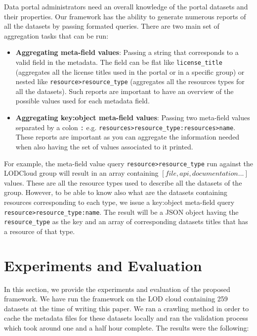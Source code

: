 \documentclass[runningheads,a4paper]{llncs}
\begin{document}
Data portal administrators need an overall knowledge of the portal datasets and their properties. Our framework has the ability to generate numerous reports of all the datasets by passing formated queries. There are two main set of aggregation tasks that can be run:
\begin{itemize}
  \item \textbf{Aggregating meta-field values}: Passing a string that corresponds to a valid field in the metadata. The field can be flat like \texttt{license\_title} (aggregates all the license titles used in the portal or in a specific group) or nested like \texttt{resource>resource\_type} (aggregates all the resources types for all the datasets). Such reports are important to have an overview of the possible values used for each metadata field.
  \item \textbf{Aggregating key:object meta-field values}: Passing two meta-field values separated by a colon \texttt{:} e.g. \texttt{resources>resource\_type:resources>name}. These reports are important as you can aggregate the information needed when also having the set of values associated to it printed.
\end{itemize}

For example, the meta-field value query \texttt{resource>resource\_type} run against the LODCloud group will result in an array containing $[file,api,documentation ...]$ values. These are all the resource types used to describe all the datasets of the group. However, to be able to know also what are the datasets containing resources corresponding to each type, we issue a key:object meta-field query \texttt{resource>resource\_type:name}. The result will be a JSON object having the \texttt{resource\_type} as the key and an array of corresponding datasets titles that has a resource of that type.


\section{Experiments and Evaluation}
\label{sec:experiment}

In this section, we provide the experiments and evaluation of the proposed framework. We have run the framework on the LOD cloud containing 259 datasets at the time of writing this paper. We ran a crawling method in order to cache the metadata files for these datasets locally and ran the validation process which took around one and a half hour complete. The results were the following:
\end{document}
